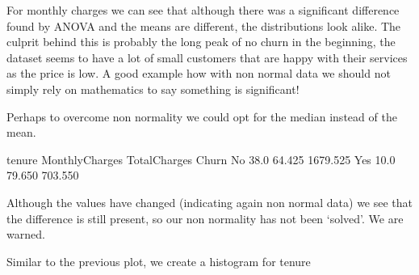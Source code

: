 \documentclass[letterpaper,10pt,english]{jupyterBook}
\begin{document}
\noindent{}

\sphinxAtStartPar
For monthly charges we can see that although there was a significant difference found by ANOVA and the means are different, the distributions look alike. The culprit behind this is probably the long peak of no churn in the beginning, the dataset seems to have a lot of small customers that are happy with their services as the price is low. A good example how with non normal data we should not simply rely on mathematics to say something is significant!

\sphinxAtStartPar
Perhaps to overcome non normality we could opt for the median instead of the mean.

\begin{sphinxVerbatim}[commandchars=\\\{\}]
\PYG{p}{[}\PYG{p}{[}  \PYG{p}{]}\PYG{p}{]}
\end{sphinxVerbatim}

\begin{sphinxVerbatim}[commandchars=\\\{\}]
       tenure  MonthlyCharges  TotalCharges
Churn                                      
No       38.0          64.425      1679.525
Yes      10.0          79.650       703.550
\end{sphinxVerbatim}

\sphinxAtStartPar
Although the values have changed (indicating again non normal data) we see that the difference is still present, so our non normality has not been ‘solved’. We are warned.

\sphinxAtStartPar
Similar to the previous plot, we create a histogram for tenure
\end{document}
